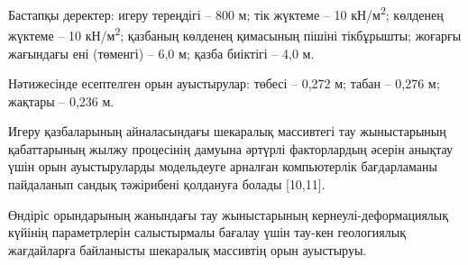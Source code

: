 \begin{multicols}{2}
Бастапқы деректер: игеру тереңдігі -- 800 м; тік жүктеме -- 10
кН/м\textsuperscript{2}; көлденең жүктеме -- 10 кН/м\textsuperscript{2};
қазбаның көлденең қимасының пішіні тікбұрышты; жоғарғы жағындағы ені
(төменгі) -- 6,0 м; қазба биіктігі -- 4,0 м.

Нәтижесінде есептелген орын ауыстырулар: төбесі -- 0,272 м; табан --
0,276 м; жақтары -- 0,236 м.

Игеру қазбаларының айналасындағы шекаралық массивтегі тау жыныстарының
қабаттарының жылжу процесінің дамуына әртүрлі факторлардың әсерін
анықтау үшін орын ауыстыруларды модельдеуге арналған компьютерлік
бағдарламаны пайдаланып сандық тәжірибені қолдануға болады {[}10,11{]}.

Өндіріс орындарының жанындағы тау жыныстарының кернеулі-деформациялық
күйінің параметрлерін салыстырмалы бағалау үшін тау-кен геологиялық
жағдайларға байланысты шекаралық массивтің орын ауыстыруы.
\end{multicols}

